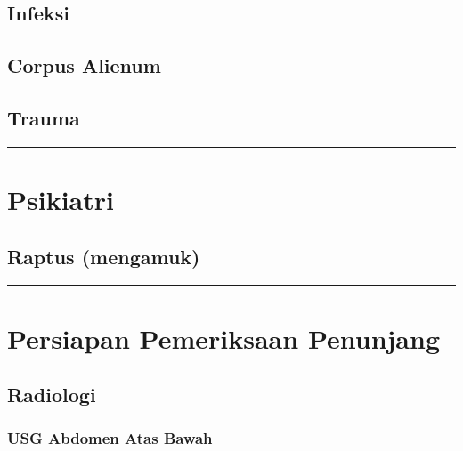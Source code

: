 \documentclass[
]{book}
\begin{document}
\hypertarget{infeksi-5}{%
\subsection{Infeksi}\label{infeksi-5}}

\hypertarget{corpus-alienum-1}{%
\subsection{Corpus Alienum}\label{corpus-alienum-1}}

\hypertarget{trauma-2}{%
\subsection{Trauma}\label{trauma-2}}

\begin{center}\rule{0.5\linewidth}{0.5pt}\end{center}

\hypertarget{psikiatri}{%
\section{Psikiatri}\label{psikiatri}}

\hypertarget{raptus-mengamuk}{%
\subsection{Raptus (mengamuk)}\label{raptus-mengamuk}}

\begin{center}\rule{0.5\linewidth}{0.5pt}\end{center}

\hypertarget{persiapan-pemeriksaan-penunjang}{%
\section{Persiapan Pemeriksaan Penunjang}\label{persiapan-pemeriksaan-penunjang}}

\hypertarget{radiologi}{%
\subsection{Radiologi}\label{radiologi}}

\hypertarget{usg-abdomen-atas-bawah}{%
\subsubsection{USG Abdomen Atas Bawah}\label{usg-abdomen-atas-bawah}}
\end{document}
